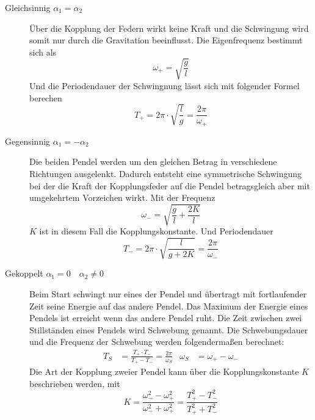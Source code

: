 \begin{description}
    \item[Gleichsinnig $\alpha_1 = \alpha_2$]
        Über die Kopplung der Federn wirkt keine Kraft und die Schwingung wird somit nur durch die Gravitation beeinflusst.
        Die Eigenfrequenz bestimmt sich als
        \begin{equation}
            \omega_+ = \sqrt{\frac{g}{l}} \label{eqn:w_p}
        \end{equation}
        Und die Periodendauer der Schwingnung lässt sich mit folgender Formel berechen 
        \begin{equation}
            T_+ = 2\pi \cdot \sqrt{\frac{l}{g}} = \frac{2\pi}{\omega_+} \label{eqn:T_p}
        \end{equation}
    \item[Gegensinnig $\alpha_1 = -\alpha_2$]
        Die beiden Pendel werden um den gleichen Betrag in verschiedene Richtungen ausgelenkt.
        Dadurch entsteht eine symmetrische Schwingung bei der die Kraft der Kopplungsfeder auf die Pendel betragsgleich aber mit umgekehrtem Vorzeichen wirkt.
        Mit der Frequenz
        \begin{equation}
            \omega_- = \sqrt{\frac{g}{l}+\frac{2K}{l}}\label{eqn:w_m}
        \end{equation}
        $K$ ist in diesem Fall die Kopplungskonstante.
        Und Periodendauer
        \begin{equation}
            T_- = 2\pi \cdot \sqrt{\frac{l}{g+2K}} = \frac{2\pi}{\omega_-}\label{eqn:T_m}
        \end{equation}
    \item[Gekoppelt $\alpha_1 =0 \quad \alpha_2 \neq 0$]
        Beim Start schwingt nur  eines der Pendel und übertragt mit fortlaufender Zeit seine Energie auf das andere Pendel. Das Maximum der Energie eines Pendels ist erreicht wenn das andere Pendel ruht.
        Die Zeit zwischen zwei Stillständen eines Pendels wird Schwebung genannt.
        Die Schwebungsdauer und die Frequenz der Schwebung werden folgendermaßen berechnet:
        \begin{align}
            T_S &= \frac{T_+ \cdot T_-}{T_+ - T_-}=\frac{2\pi}{\omega_S}  & \omega_S &= \omega_+ - \omega_- \label{eqn:Schwebung}
        \end{align}
        Die Art der Kopplung zweier Pendel kann über die Kopplungskonstante $K$ beschrieben werden, mit
        \begin{equation}
            K = \frac{\omega_-^2 - \omega_+^2}{\omega_-^2 + \omega_+^2} = \frac{T_+^2 - T_-^2}{T_+^2 + T_-^2} \label{eqn:Kopplung}
        \end{equation}
\end{description}
